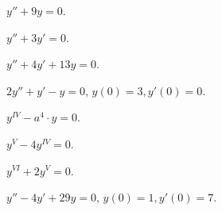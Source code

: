 \begin{problem}
	$y'' + 9 y = 0$.
\end{problem}

\begin{problem}
	$y'' + 3 y' = 0$.
\end{problem}

\begin{problem}
	$y'' + 4 y' + 13 y = 0$.
\end{problem}

\begin{problem}
	$2 y'' + y' - y = 0$, $y(0) = 3, y'(0) = 0$.
\end{problem}

\begin{problem}
	$y^{IV} - a^4 \cdot y = 0$.
\end{problem}

\begin{problem}
	$y^V - 4 y^{IV} = 0$.
\end{problem}

\begin{problem}
	$y^{VI} + 2 y^V = 0$.
\end{problem}

\begin{problem}
	$y'' - 4 y' + 29 y = 0$, $y(0) = 1, y'(0) = 7$.
\end{problem}
